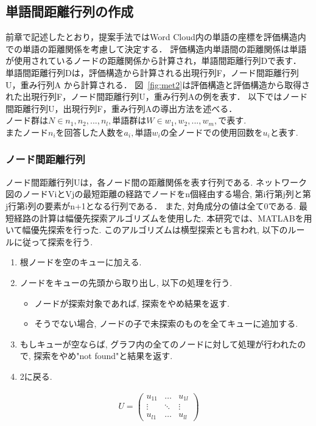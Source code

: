 \documentclass[syuuron]{kuee}
\begin{document}
		\subsection{単語間距離行列の作成}
			前章で記述したとおり，提案手法ではWord Cloud内の単語の座標を評価構造内での単語の距離関係を考慮して決定する．
			評価構造内単語間の距離関係は単語が使用されているノードの距離関係から計算され，単語間距離行列Dで表す．
			単語間距離行列Dは，評価構造から計算される出現行列F，ノード間距離行列U，重み行列A から計算される．
			図~\ref{fig:met2}は評価構造と評価構造から取得された出現行列F，ノード間距離行列U，重み行列Aの例を表す．
			以下ではノード間距離行列U，出現行列F，重み行列Aの導出方法を述べる．
			$ノード群はN \in {n_{1}, n_{2}, ..., n_{l}}, 単語群はW \in {w_{1}, w_{2}, ..., w_{m}}, で表す. $
			$またノードn_iを回答した人数をa_i, 単語w_iの全ノードでの使用回数をu_iと表す. $
			
			\subsubsection{ノード間距離行列}
				ノード間距離行列Uは，各ノード間の距離関係を表す行列である. 
				ネットワーク図のノードViとVjの最短距離の経路でノードをn個経由する場合, 
				第i行第j列と第j行第i列の要素がn+1となる行列である．
				また, 対角成分の値は全て0である. 
				最短経路の計算は幅優先探索アルゴリズムを使用した. 
				本研究では、MATLABを用いて幅優先探索を行った. 
				このアルゴリズムは横型探索とも言われ, 以下のルールに従って探索を行う. 
				
				\begin{enumerate}
					\item 根ノードを空のキューに加える. 
					\item ノードをキューの先頭から取り出し, 以下の処理を行う. 
						\begin{itemize}
							\item ノードが探索対象であれば, 探索をやめ結果を返す. 
							\item そうでない場合, ノードの子で未探索のものを全てキューに追加する. 
						\end{itemize}
					\item もしキューが空ならば, グラフ内の全てのノードに対して処理が行われたので, 探索をやめ"not found"と結果を返す. 
					\item 2に戻る. 
				\end{enumerate}
				
				\begin{eqnarray}
				 U = \left(
				    \begin{array}{cccc}
				    	u_{11} & \ldots & u_{1l} \\
				    	\vdots & \ddots & \vdots \\
				    	u_{l1} & \ldots & u_{ll}
					\end{array}
				 \right)
				\end{eqnarray}	
		
\end{document}

